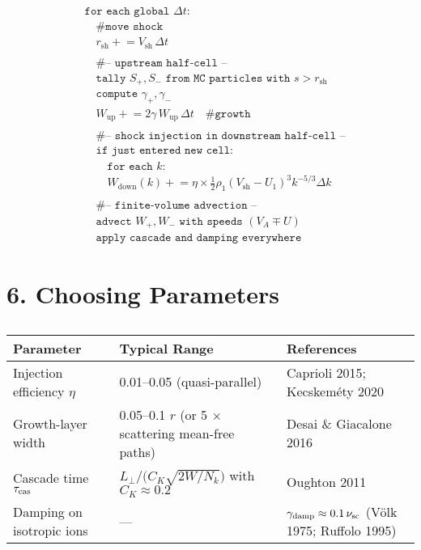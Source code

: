 \[
\begin{aligned}
&\texttt{for each global } \Delta t: \\
&\quad \texttt{\# move shock} \\
&\quad r_{\text{sh}} \mathrel{+}= V_{\text{sh}} \, \Delta t \\
\\
&\quad \texttt{\# -- upstream half-cell --} \\
&\quad \texttt{tally } S_{+}, S_{-} \texttt{ from MC particles with } s > r_{\text{sh}} \\
&\quad \texttt{compute } \gamma_{+}, \gamma_{-} \\
&\quad W_{\text{up}} \mathrel{+}= 2\gamma \, W_{\text{up}} \, \Delta t \quad \texttt{\# growth} \\
\\
&\quad \texttt{\# -- shock injection in downstream half-cell --} \\
&\quad \texttt{if just entered new cell:} \\
&\quad\quad \texttt{for each } k: \\
&\quad\quad W_{\text{down}}(k) \mathrel{+}= \eta \times \frac{1}{2} \rho_1 (V_{\text{sh}} - U_1)^3 k^{-5/3} \Delta k \\
\\
&\quad \texttt{\# -- finite-volume advection --} \\
&\quad \texttt{advect } W_{+}, W_{-} \texttt{ with speeds } (V_A \mp U) \\
&\quad \texttt{apply cascade and damping everywhere}
\end{aligned}
\]
\section*{6. Choosing Parameters}

\begin{table}[h!]
\centering
\begin{tabular}{|p{4.5cm}|p{5cm}|p{6cm}|}
\hline
\textbf{Parameter} & \textbf{Typical Range} & \textbf{References} \\
\hline
Injection efficiency $\eta$ & 0.01--0.05 (quasi-parallel) & Caprioli 2015; Kecskeméty 2020 \\
\hline
Growth-layer width & 0.05--0.1 $r$ (or 5 $\times$ scattering mean-free paths) & Desai \& Giacalone 2016 \\
\hline
Cascade time $\tau_{\rm cas}$ & $L_\perp / \bigl(C_K \sqrt{2W/N_k}\bigr)$ with $C_K \approx 0.2$ & Oughton 2011 \\
\hline
Damping on isotropic ions & --- & $\gamma_{\rm damp} \approx 0.1\,\nu_{\rm sc}$ (Völk 1975; Ruffolo 1995) \\
\hline
\end{tabular}
\caption*{}
\end{table}


